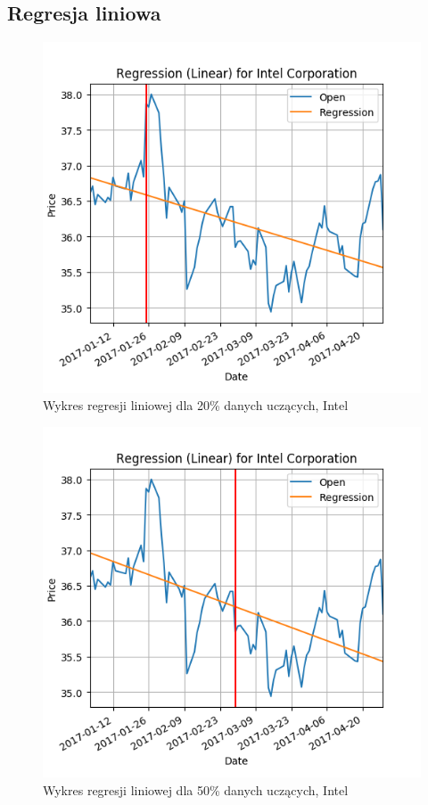 \subsection{Regresja liniowa}

\begin{figure}[h!]
\centering
\includegraphics[width=150mm]{pictures/plots/intel_linear_20.png}
\caption{Wykres regresji liniowej dla 20\% danych uczących, Intel}
\label{fig:Wykres regresji liniowej dla 20\% danych uczących, Intel}
\end{figure}

\begin{figure}[h!]
\centering
\includegraphics[width=150mm]{pictures/plots/intel_linear_50.png}
\caption{Wykres regresji liniowej dla 50\% danych uczących, Intel}
\label{fig:Wykres regresji liniowej dla 50\% danych uczących, Intel}
\end{figure}

